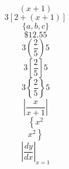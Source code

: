\documentclass[11pt]{article}
\begin{document}
$$(x+1)$$
$$3[2+(x+1)]$$
$$\{a,b,c\}$$
$$\$12.55$$
$$3\left(\frac{2}{5}\right){5}$$
$$3\left[\frac{2}{5}\right]{5}$$
$$3\left\{\frac{2}{5}\right\}{5}$$
$$\left|\frac{x}{x+1}\right|$$
$$\left\{x^2\right.$$
$$\left.x^2\right\}$$
$$\left| \frac{dy}{dx} \right|_{x=1}$$
\end{document}
